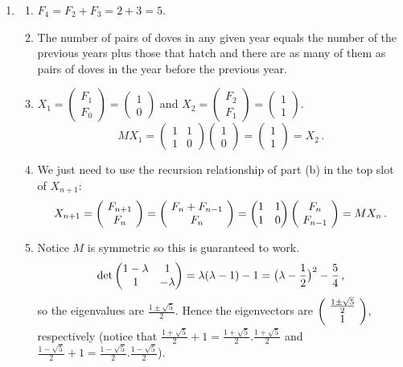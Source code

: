 \begin{enumerate}
\item 
\begin{enumerate}
\item $F_4=F_2+F_3=2+3=5$.
\item The number of pairs of doves in any given year equals the number of the previous years plus those that hatch and there are as many of them as pairs of doves in the year before the previous year.
\item $X_1=\begin{pmatrix}F_1\\F_0\end{pmatrix}=\begin{pmatrix}1\\0\end{pmatrix}$
and $X_2=\begin{pmatrix}F_2\\F_1\end{pmatrix}=\begin{pmatrix}1\\1\end{pmatrix}$.
$$
MX_1=\begin{pmatrix}1 & 1\\ 1& 0\end{pmatrix}\begin{pmatrix}1\\ 0\end{pmatrix}
=\begin{pmatrix}1\\1\end{pmatrix}=X_2\, .
$$
\item We just need to use the recursion relationship of part (b) in the top slot of $X_{n+1}$:
$$
X_{n+1}=\left(\!\begin{array}{c} F_{n+1}\\F_n \end{array}\!\right)
=\left(\!\begin{array}{c} F_{n}+F_{n-1}\\F_n \end{array}\!\right)=
\begin{pmatrix}1 & 1\\ 1& 0\end{pmatrix}\left(\!\begin{array}{c} F_{n}\\F_{n-1} \end{array}\!\right)=M X_n\, .
$$
\item Notice $M$ is symmetric so this is guaranteed to work. $$\det \begin{pmatrix}1-\lambda&\mc1\\\mc1&-\lambda\end{pmatrix}=\lambda(\lambda-1)-1=\big(\lambda-\frac12\big)^2-\frac54\, ,$$
so the eigenvalues are $\frac{1\pm\sqrt{5}}{2}$. Hence the eigenvectors are $\left(\!\begin{array}{c} \frac{1\pm\sqrt{5}}{2}\\1 \end{array}\!\right)$, respectively (notice that $\frac{1+\sqrt{5}}{2}+1=\frac{1+\sqrt{5}}{2}.\frac{1+\sqrt{5}}{2}$ and $\frac{1-\sqrt{5}}{2}+1=\frac{1-\sqrt{5}}{2}.\frac{1-\sqrt{5}}{2}$).

\end{enumerate}
\end{enumerate}
